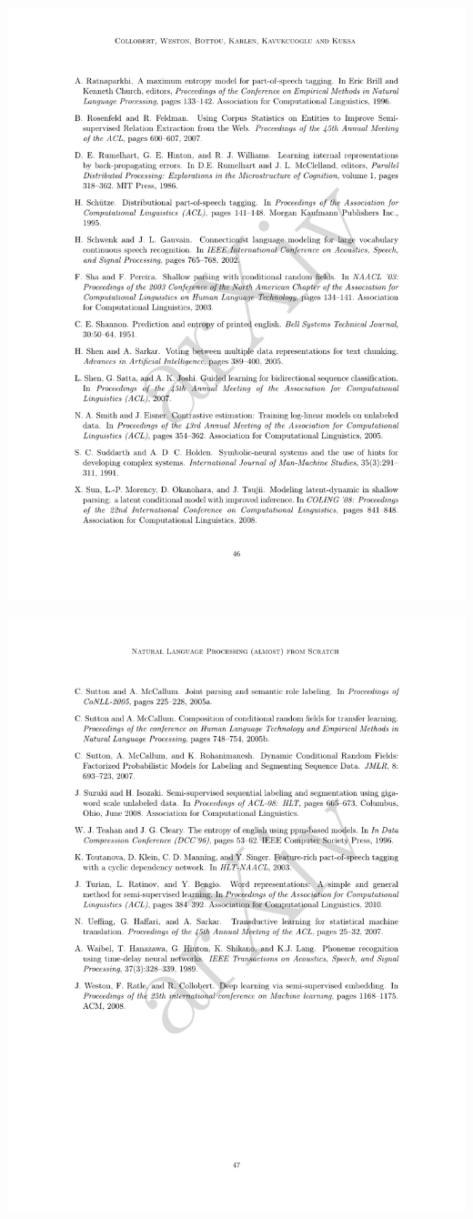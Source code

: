 \begin{center}
\includegraphics[width=\textwidth]{translations/collobert_2011-46.jpg}
\end{center}
\begin{center}
\includegraphics[width=\textwidth]{translations/collobert_2011-47.jpg}
\end{center}
